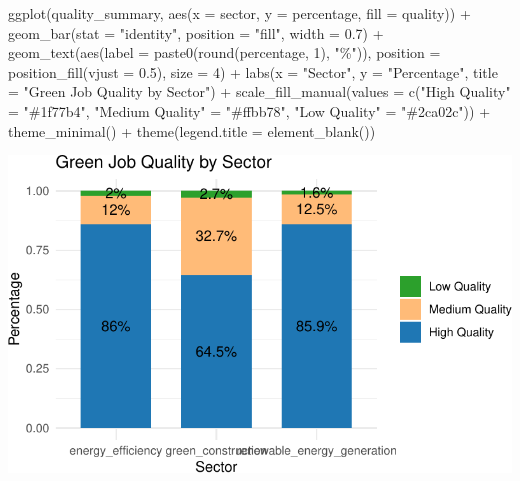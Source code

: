 \documentclass[
  letterpaper,
  DIV=11,
  numbers=noendperiod]{scrartcl}
\newenvironment{Shaded}{\begin{snugshade}}{\end{snugshade}}
\newcommand{\AttributeTok}[1]{\textcolor[rgb]{0.40,0.45,0.13}{#1}}
\newcommand{\DecValTok}[1]{\textcolor[rgb]{0.68,0.00,0.00}{#1}}
\newcommand{\FloatTok}[1]{\textcolor[rgb]{0.68,0.00,0.00}{#1}}
\newcommand{\FunctionTok}[1]{\textcolor[rgb]{0.28,0.35,0.67}{#1}}
\newcommand{\NormalTok}[1]{\textcolor[rgb]{0.00,0.23,0.31}{#1}}
\newcommand{\OtherTok}[1]{\textcolor[rgb]{0.00,0.23,0.31}{#1}}
\newcommand{\SpecialCharTok}[1]{\textcolor[rgb]{0.37,0.37,0.37}{#1}}
\newcommand{\StringTok}[1]{\textcolor[rgb]{0.13,0.47,0.30}{#1}}
\begin{document}
\begin{Shaded}
\begin{Highlighting}[]
\FunctionTok{ggplot}\NormalTok{(quality\_summary, }\FunctionTok{aes}\NormalTok{(}\AttributeTok{x =}\NormalTok{ sector, }\AttributeTok{y =}\NormalTok{ percentage, }\AttributeTok{fill =}\NormalTok{ quality)) }\SpecialCharTok{+}
  \FunctionTok{geom\_bar}\NormalTok{(}\AttributeTok{stat =} \StringTok{"identity"}\NormalTok{, }\AttributeTok{position =} \StringTok{"fill"}\NormalTok{, }\AttributeTok{width =} \FloatTok{0.7}\NormalTok{) }\SpecialCharTok{+}
  \FunctionTok{geom\_text}\NormalTok{(}\FunctionTok{aes}\NormalTok{(}\AttributeTok{label =} \FunctionTok{paste0}\NormalTok{(}\FunctionTok{round}\NormalTok{(percentage, }\DecValTok{1}\NormalTok{), }\StringTok{"\%"}\NormalTok{)), }
            \AttributeTok{position =} \FunctionTok{position\_fill}\NormalTok{(}\AttributeTok{vjust =} \FloatTok{0.5}\NormalTok{), }\AttributeTok{size =} \DecValTok{4}\NormalTok{) }\SpecialCharTok{+}
  \FunctionTok{labs}\NormalTok{(}\AttributeTok{x =} \StringTok{"Sector"}\NormalTok{, }\AttributeTok{y =} \StringTok{"Percentage"}\NormalTok{, }\AttributeTok{title =} \StringTok{"Green Job Quality by Sector"}\NormalTok{) }\SpecialCharTok{+}
  \FunctionTok{scale\_fill\_manual}\NormalTok{(}\AttributeTok{values =} \FunctionTok{c}\NormalTok{(}\StringTok{"High Quality"} \OtherTok{=} \StringTok{"\#1f77b4"}\NormalTok{, }\StringTok{"Medium Quality"} \OtherTok{=} \StringTok{"\#ffbb78"}\NormalTok{, }\StringTok{"Low Quality"} \OtherTok{=} \StringTok{"\#2ca02c"}\NormalTok{)) }\SpecialCharTok{+}
  \FunctionTok{theme\_minimal}\NormalTok{() }\SpecialCharTok{+}
  \FunctionTok{theme}\NormalTok{(}\AttributeTok{legend.title =} \FunctionTok{element\_blank}\NormalTok{())}
\end{Highlighting}
\end{Shaded}

\includegraphics{index_files/figure-pdf/unnamed-chunk-28-1.pdf}
\end{document}
